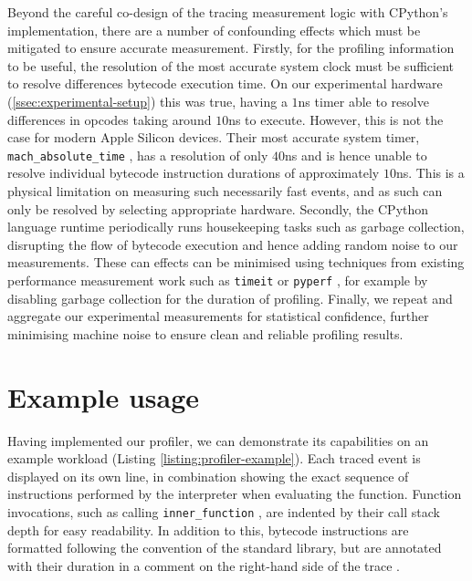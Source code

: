 Beyond the careful co-design of the tracing measurement logic with CPython's implementation, there are a number of confounding effects which must be mitigated to ensure accurate measurement.
Firstly, for the profiling information to be useful, the resolution of the most accurate system clock must be sufficient to resolve differences bytecode execution time. On our experimental hardware (\autoref{ssec:experimental-setup}) this was true, having a $1$ns timer able to resolve differences in opcodes taking around $10$ns to execute. However, this is not the case for modern Apple Silicon devices. Their most accurate system timer, \texttt{mach\_absolute\_time} \cite{appleinc.Mach_absolute_time}, has a resolution of only $40$ns and is hence unable to resolve individual bytecode instruction durations of approximately $10$ns. This is a physical limitation on measuring such necessarily fast events, and as such can only be resolved by selecting appropriate hardware.
Secondly, the CPython language runtime periodically runs housekeeping tasks such as garbage collection, disrupting the flow of bytecode execution and hence adding random noise to our measurements. These can effects can be minimised using techniques from existing performance measurement work such as \texttt{timeit} \cite{pythonsoftwarefoundationTimeitMeasureExecution} or \texttt{pyperf} \cite{victorstinnerPsfPyperf2025}, for example by disabling garbage collection for the duration of profiling.
Finally, we repeat and aggregate our experimental measurements for statistical confidence, further minimising machine noise to ensure clean and reliable profiling results.


\section{Example usage}
\label{sec:profiling-bytecode-examples}

Having implemented our profiler, we can demonstrate its capabilities on an example workload (Listing \ref{listing:profiler-example}).
Each traced event is displayed on its own line, in combination showing the exact sequence of instructions performed by the interpreter when evaluating the function. Function invocations, such as calling \texttt{inner\_function} , are indented by their call stack depth for easy readability. In addition to this, bytecode instructions are formatted following the convention of the standard library, but are annotated with their duration in a comment on the right-hand side of the trace .


